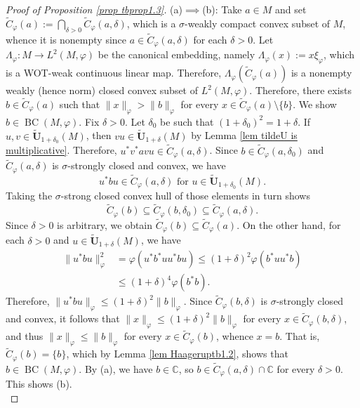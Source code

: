 \documentclass[12pt]{amsart}
\theoremstyle{definition}
\newcommand{\C}{\mathbb{C}}
\def\BC{\operatorname{BC}}
\begin{document}
\begin{proof}[Proof of Proposition \ref{prop tbprop1.3}]
(a)$\implies$(b):  Take $a\in M$ and set $\widetilde{C}_{\varphi}(a):=\bigcap_{\delta>0}\widetilde{C}_{\varphi}(a,\delta)$, which is a $\sigma$-weakly compact convex subset of $M$, whence it is nonempty since $a\in \widetilde{C}_{\varphi}(a,\delta)$ for each $\delta>0$. Let $\Lambda_{\varphi}\colon M\to L^2(M,\varphi)$ be the canonical embedding, namely $\Lambda_\varphi(x):=x\xi_\varphi$, which is a WOT-weak continuous linear map. Therefore, $\Lambda_{\varphi}(\widetilde{C}_{\varphi}(a))$ is a nonempty weakly (hence norm) closed convex subset of $L^2(M,\varphi)$. Therefore, there exists $b\in \widetilde{C}_{\varphi}(a)$ such that $\|x\|_{\varphi}>\|b\|_{\varphi}$ for every $x\in \widetilde{C}_{\varphi}(a)\setminus \{b\}$.  We show $b\in \BC(M,\varphi)$. Fix $\delta>0$. Let $\delta_0$ be such that $(1+\delta_0)^2=1+\delta$.  If $u,v\in \tilde{\mathbf{U}}_{1+\delta_0}(M)$, then $vu\in \tilde{\mathbf{U}}_{1+\delta}(M)$ by Lemma \ref{lem tildeU is multiplicative}. Therefore, $u^*v^*avu\in \widetilde{C}_{\varphi}(a,\delta)$. Since $b\in \widetilde{C}_{\varphi}(a,\delta_0)$ and  $\widetilde{C}_{\varphi}(a,\delta)$ is $\sigma$-strongly closed and convex, we have 
$$u^*bu\in \widetilde{C}_{\varphi}(a,\delta) \text{ for }u\in \tilde{\mathbf{U}}_{1+\delta_0}(M).$$
Taking the $\sigma$-strong closed convex hull of those elements in turn shows 
$$\widetilde{C}_{\varphi}(b)\subseteq \widetilde{C}_{\varphi}(b,\delta_0)\subseteq \widetilde{C}_{\varphi}(a,\delta).$$
Since $\delta>0$ is arbitrary, we obtain $\widetilde{C}_{\varphi}(b)\subseteq \widetilde{C}_{\varphi}(a)$. On the other hand, for each $\delta>0$ and $u\in \tilde{\mathbf{U}}_{1+\delta}(M)$,  we have 
\begin{align*}
    \|u^*bu\|_{\varphi}^2&=\varphi(u^*b^*uu^*bu)\le (1+\delta)^2\varphi(b^*uu^*b)\\
    &\le (1+\delta)^4\varphi(b^*b).
\end{align*}
Therefore, $\|u^*bu\|_{\varphi}\le (1+\delta)^2\|b\|_{\varphi}$. Since $\widetilde{C}_{\varphi}(b,\delta)$ is $\sigma$-strongly closed and convex, it follows that $\|x\|_{\varphi}\le (1+\delta)^2\|b\|_{\varphi}$ for every $x\in \widetilde{C}_{\varphi}(b,\delta)$, and thus $\|x\|_{\varphi}\le \|b\|_{\varphi}$ for every $x\in \widetilde{C}_{\varphi}(b)$, whence $x=b$. That is, $\widetilde{C}_{\varphi}(b)=\{b\}$, which by Lemma \ref{lem Haageruptb1.2}, shows that $b\in \BC(M,\varphi)$. By (a), we have $b\in \C$, so $b\in \widetilde{C}_{\varphi}(a,\delta)\cap \C$ for every $\delta>0$. This shows (b).\\


\end{proof}
\end{document}

